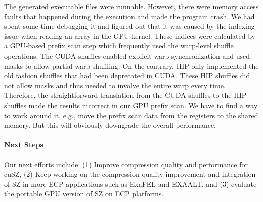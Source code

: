 The generated executable files were runnable. However, there were memory access faults that happened during the execution and made the program crash. We had spent some time debugging it and figured out that it was caused by the indexing issue when reading an array in the GPU kernel. These indices were calculated by a GPU-based prefix scan step which frequently used the warp-level shuffle operations. The CUDA shuffles enabled explicit warp synchronization and used masks to allow partial warp shuffling. On the contrary, HIP only implemented the old fashion shuffles that had been deprecated in CUDA. These HIP shuffles did not allow masks and thus needed to involve the entire warp every time. Therefore, the straightforward translation from the CUDA shuffles to the HIP shuffles made the results incorrect in our GPU prefix scan. We have to find a way to work around it, e.g., move the prefix scan data from the registers to the shared memory. But this will obviously downgrade the overall performance.


\paragraph{Next Steps} Our next efforts include: (1) Improve compression quality and performance for cuSZ, (2) Keep working on the compression quality improvement and integration of SZ in more ECP applications such as ExaFEL and EXAALT, and (3) evaluate the portable GPU version of SZ on ECP platforms.

